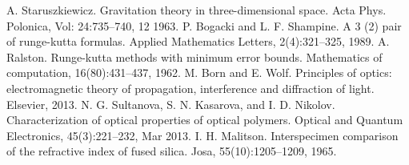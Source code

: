 \documentclass[a4paper,12pkt]{report}
\begin{document}
\begin{thebibliography}{25}
 A. Staruszkiewicz. Gravitation theory in three-dimensional space. Acta Phys. Polonica, Vol: 24:735–740, 12 1963.
 P. Bogacki and L. F. Shampine. A 3 (2) pair of runge-kutta formulas. Applied Mathematics Letters, 2(4):321–325, 1989.
 A. Ralston. Runge-kutta methods with minimum error bounds. Mathematics of computation, 16(80):431–437, 1962.
 M. Born and E. Wolf. Principles of optics: electromagnetic theory of propagation, interference and diffraction of light. Elsevier, 2013.
 N. G. Sultanova, S. N. Kasarova, and I. D. Nikolov. Characterization of optical properties of optical polymers. Optical and Quantum Electronics, 45(3):221–232, Mar 2013.
 I. H. Malitson. Interspecimen comparison of the refractive index of fused silica. Josa, 55(10):1205–1209, 1965.
\end{thebibliography}


















\end{document}
